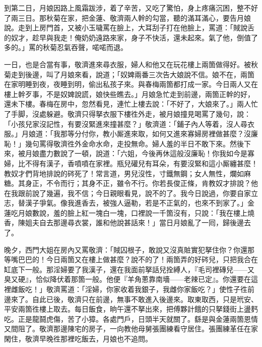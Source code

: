 到第二日，月娘因路上風霜跋涉，着了辛苦，又吃了驚怕，身上疼痛沉困，整不好了兩三日。那秋菊在家，把金蓮、敬濟兩人幹的勾當，聽的滿耳滿心，要告月娘說。走到上房門首，又被小玉噦罵在臉上，大耳刮子打在他臉上，罵道：「賊說舌的奴才，趁早與我走！俺奶奶遠路來家，身子不快活，還未起來。氣了他，倒值了多的。」罵的秋菊忍氣吞聲，喏喏而退。

一日，也是合當有事，敬濟進來尋衣服，婦人和他又在玩花樓上兩箇做得好。被秋菊走到後邊，叫了月娘來看，說道；「奴婢兩番三次告大娘說不信。娘不在，兩箇在家明睡到夜，夜睡到明，偷出私孩子來。與春梅兩箇都打成一家。今日兩人又在樓上幹歹事，不是奴婢說謊，娘快些瞧去。」月娘急忙走到前邊，兩箇正幹的好，還未下樓。春梅在房中，忽然看見，連忙上樓去說：「不好了，大娘來了。」兩人忙了手脚，沒處躲避。敬濟只得拏衣服下樓徃外走，被月娘撞見喝罵了幾句，說：「小孩兒家沒記性，有要沒緊進來撞甚麼？」敬濟道：「鋪子內人等着，沒人尋衣服。」月娘道：「我那等分付你，教小厮進來取，如何又進來寡婦房裡做甚麼？沒廉恥！」幾句罵得敬濟徃外金命水命，走投無命。婦人羞的半日不敢下來。{}然後下來，被月娘盡力數說了一頓，說道：「六姐，今後再休這般沒廉恥！你我如今是寡婦，比不得有漢子，香噴噴在家裡。瓶兒礶兒有耳朵，有要沒緊和這小厮纏甚麼！教奴才們背地排說的硶死了！常言道，男兒沒性，寸鐵無鋼；女人無性，爛如麻糖。其身正，不令而行；其身不正，雖令不行。你若長俊正條，肯教奴才排說？他在我跟前說了幾遍，我不信；今日親眼看見，說不的了。我今日說過，你要自家立志，替漢子爭氣。像我進香去，被強人逼勒，若是不正氣的，也來不到家了。」{}金蓮吃月娘數說，羞的臉上紅一塊白一塊，口裡說一千箇沒有，只說：「我在樓上燒香，陳姐夫自去那邊尋衣裳，誰和他說甚話來！」{}當日月娘亂了一囘，歸後邊去了。

晚夕，西門大姐在房內又罵敬濟：「賊囚根子，敢說又沒真賍實犯拏住你？你還那等嘴巴巴的！今日兩箇又在樓上做甚麼？說不的了！兩箇弄的好硶兒，只把我合在缸底下一般。那淫婦要了我漢子，還在我面前拏話兒拴縛人，『毛司裡磚兒——又臭又硬』，{}恰似降伏着那箇一般。他便『羊角蔥靠南墻——老辣已定』。你還要在這裡雌飯吃！」敬濟罵道：「淫婦，你家收着我銀子，我雌你家飯吃？」使性子徃前邊來了。{}自此已後，敬濟只在前邊，無事不敢進入後邊來。取東取西，只是玳安、平安兩箇徃樓上取去。每日飯食，晌午還不拏出來，把傅夥計餓的只拏錢街上盪麫吃。{}正是龍鬪虎傷，苦了小獐。各處門戶，日頭半天就關了。{}繇是與金蓮兩箇恩情又間阻了。{}敬濟那邊陳宅的房子，一向教他母舅張團練看守居住。張團練革任在家閑住，敬濟早晚徃那裡吃飯去，月娘也不追問。

